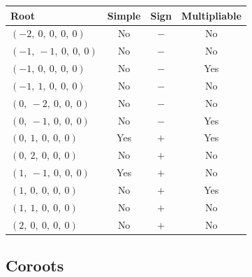 \documentclass[11pt]{article}
\theoremstyle{definition}
\begin{document}
\begin{tabular}{|l|c|c|c|}
    \hline
    \textbf{Root} & \textbf{Simple} & \textbf{Sign} & \textbf{Multipliable} \\
    \hline
    $\left( -2, \  0, \  0, \  0, \  0\right)$ & No & $-$ & No \\
    \hline
    $\left( -1, \  -1, \  0, \  0, \  0\right)$ & No & $-$ & No \\
    \hline
    $\left( -1, \  0, \  0, \  0, \  0\right)$ & No & $-$ & Yes \\
    \hline
    $\left( -1, \  1, \  0, \  0, \  0\right)$ & No & $-$ & No \\
    \hline
    $\left( 0, \  -2, \  0, \  0, \  0\right)$ & No & $-$ & No \\
    \hline
    $\left( 0, \  -1, \  0, \  0, \  0\right)$ & No & $-$ & Yes \\
    \hline
    $\left( 0, \  1, \  0, \  0, \  0\right)$ & Yes & $+$ & Yes \\
    \hline
    $\left( 0, \  2, \  0, \  0, \  0\right)$ & No & $+$ & No \\
    \hline
    $\left( 1, \  -1, \  0, \  0, \  0\right)$ & Yes & $+$ & No \\
    \hline
    $\left( 1, \  0, \  0, \  0, \  0\right)$ & No & $+$ & Yes \\
    \hline
    $\left( 1, \  1, \  0, \  0, \  0\right)$ & No & $+$ & No \\
    \hline
    $\left( 2, \  0, \  0, \  0, \  0\right)$ & No & $+$ & No \\
    \hline
\end{tabular}


\subsection{Coroots}
\end{document}
